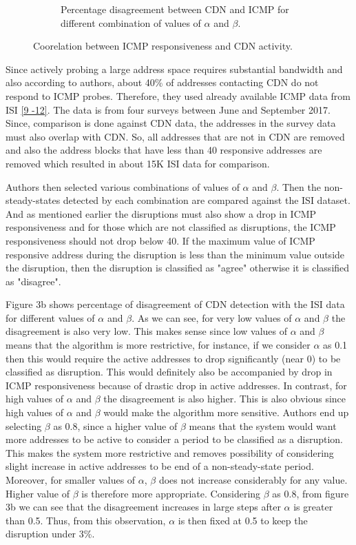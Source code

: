 \documentclass[11pt,twoside,a4paper]{article}
\begin{document}
\begin{figure}[h!]
\begin{subfigure}[b]{75mm}
    \caption{Percentage disagreement between CDN and ICMP for different combination of values of $\alpha$ and $\beta$. \newline}
  \end{subfigure}
  \caption{Coorelation between ICMP responsiveness and CDN activity.}
  \label{fig:CDNAndICMP}
\end{figure}

Since actively probing a large address space requires substantial bandwidth and also according to authors, about 40\% of addresses contacting CDN do not respond to ICMP probes. Therefore, they used already available ICMP data from ISI \hyperlink {K9} {[9 -12]}. The data is from four surveys between June and September 2017. Since, comparison is done against CDN data, the addresses in the survey data must also overlap with CDN. So, all addresses that are not in CDN are removed and also the address blocks that have less than 40 responsive addresses are removed which resulted in about 15K ISI data for comparison.  

Authors then selected various combinations of values of $\alpha$ and $\beta$. Then the non-steady-states detected by each combination are compared against the ISI dataset. And as mentioned earlier the disruptions must also show a drop in ICMP responsiveness and for those which are not classified as disruptions, the ICMP responsiveness should not drop below 40. If the maximum value of ICMP responsive address during the disruption is less than the minimum value outside the disruption, then the disruption is classified as "agree" otherwise it is classified as  "disagree".

Figure 3b shows percentage of disagreement of CDN detection with the ISI data for different values of $\alpha$ and $\beta$. As we can see, for very low values of $\alpha$ and $\beta$ the disagreement is also very low. This makes sense since low values of $\alpha$ and $\beta$ means that the algorithm is more restrictive, for instance, if we consider $\alpha$ as 0.1 then this would require the active addresses to drop significantly (near 0) to be classified as disruption. This would definitely also be accompanied by drop in ICMP responsiveness because of drastic drop in active addresses. In contrast, for high values of $\alpha$ and $\beta$ the disagreement is also higher. This is also obvious since high values of $\alpha$ and $\beta$ would make the algorithm more sensitive. Authors end up selecting $\beta$ as 0.8, since a higher value of $\beta$ means that the system would want more addresses to be active to consider a period to be classified as a disruption. This makes the system more restrictive and removes possibility of considering slight increase in active addresses to be end of a non-steady-state period. Moreover, for smaller values of $\alpha$, $\beta$ does not increase considerably for any value. Higher value of $\beta$ is therefore more appropriate.  Considering $\beta$ as 0.8, from figure 3b we can see that the disagreement increases in large steps after $\alpha$ is greater than 0.5. Thus, from this observation, $\alpha$ is then fixed at 0.5 to keep the disruption under 3\%.
\end{document}
